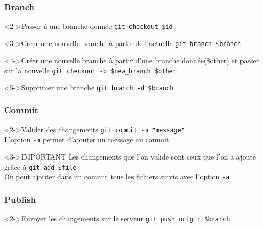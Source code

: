 		\begin{frame}[fragile]
			\frametitle{Branch}
			\begin{block}<2->{Passer à une branche donnée}
				\verb'git checkout $id'
			\end{block}
			\begin{block}<3->{Créer une nouvelle branche à partir de l'actuelle}
				\verb'git branch $branch'
			\end{block}
			\begin{block}<4->{Créer une nouvelle branche à partir d'une branche donnée(\$other) et passer sur la nouvelle}
				\verb'git checkout -b $new_branch $other'
			\end{block}
			\begin{alertblock}<5->{Supprimer une branche}
				\verb'git branch -d $branch'
			\end{alertblock}

			
		\end{frame}

		\begin{frame}[fragile]
			\frametitle{Commit}
			\begin{block}<2->{Valider des changements}
				\verb'git commit -m "message"'\\
				L'option \verb'-m' permet d'ajouter un message au commit				
			\end{block}
			\begin{alertblock}<3->{IMPORTANT}
				Les changements que l'on valide sont ceux que l'on a ajouté grâce à \verb'git add $file'\\
				On peut ajouter dans un commit tous les fichiers suivis avec l'option \verb'-a'
			\end{alertblock}
			
		\end{frame}

		\begin{frame}[fragile]
			\frametitle{Publish}
			\begin{block}<2->{Envoyer les changements sur le serveur}
				\verb'git push origin $branch'\\	
			\end{block}
		\end{frame}

